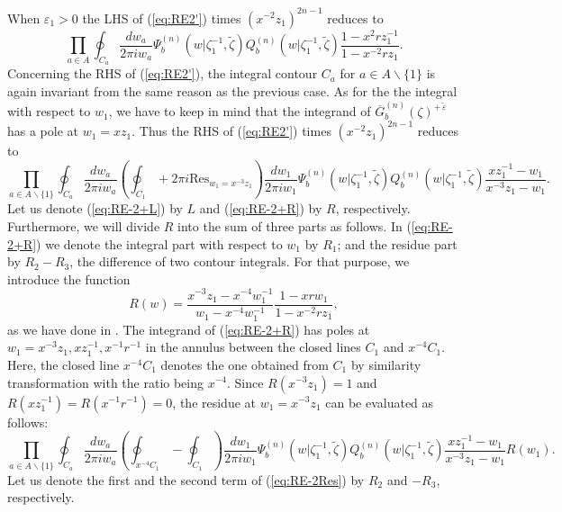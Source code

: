 \documentclass[a4paper,10pt]{article}
\begin{document}
{When $\varepsilon_{1}>0$ the LHS of (\ref{eq:RE2'}) 
times $(x^{-2}z_1)^{2n-1}$ reduces to 
\begin{equation}
\prod_{a\in A}\oint_{C_a} 
\dfrac{dw_a}{2\pi iw_a} 
\Psi_{b}^{(n)} (w|\zeta_1^{-1},\tilde{\zeta})
Q_b^{(n)}(w|\zeta_1^{-1},\tilde{\zeta})
\frac{1-x^2 rz_{1}^{-1}}{1-x^{-2}rz_{1}}. 
\label{eq:RE-2+L}
\end{equation}
Concerning the RHS of (\ref{eq:RE2'}), the integral 
contour $C_a$ for $a\in A\backslash\{ 1\}$ is again 
invariant from the same reason as the previous case. 
As for the the integral with respect to $w_1$, we 
have to keep in mind that the integrand of 
$\overline{G}_{b}^{(n)} (\zeta)^{+\,\tilde{\varepsilon}}$ 
has a pole at $w_1 =xz_1$. Thus the RHS of (\ref{eq:RE2'}) 
times $(x^{-2}z_1)^{2n-1}$ reduces to 
\begin{equation}
\prod_{a\in A\backslash\{ 1\}}\oint_{C_a} 
\dfrac{dw_a}{2\pi iw_a} 
\left( \oint_{C_1} +2\pi i
\mbox{Res}_{w_1 =x^{-3}z_1} \right) 
\dfrac{dw_1}{2\pi iw_1} 
\Psi_{b}^{(n)} (w|\zeta_1^{-1},\tilde{\zeta})
Q_b^{(n)}(w|\zeta_1^{-1},\tilde{\zeta})
\frac{xz_{1}^{-1}-w_1}{x^{-3}z_{1}-w_1}. 
\label{eq:RE-2+R}
\end{equation}
Let us denote (\ref{eq:RE-2+L}) by $L$ and 
(\ref{eq:RE-2+R}) by $R$, respectively. Furthermore, 
we will divide $R$ into the sum of three parts as follows. 
In (\ref{eq:RE-2+R}) we denote the integral part 
with respect to $w_1$ by $R_1$; and the residue part 
by $R_2 -R_3$, the difference of two contour integrals. 
For that purpose, we introduce the function 
$$
R(w)=
\frac{x^{-3}z_1 -x^{-4}w_1^{-1}}{w_1 -x^{-4}w_1^{-1}}
\frac{1-xrw_1}{1-x^{-2}rz_1}, 
$$
as we have done in \cite{JKMQ}. 
The integrand of (\ref{eq:RE-2+R}) has poles at 
$w_1 =x^{-3}z_1, xz_1^{-1}, x^{-1}r^{-1}$ in the 
annulus between the closed lines $C_1$ and $x^{-4}C_1$. 
Here, the closed line $x^{-4}C_1$ denotes the one 
obtained from $C_1$ by similarity transformation with the 
ratio being $x^{-4}$. Since 
$R(x^{-3}z_1 )=1$ and $R(xz_1^{-1})=R(x^{-1}r^{-1})=0$, 
the residue at $w_1 =x^{-3}z_1$ can be evaluated as follows: 
\begin{equation}
\prod_{a\in A\backslash\{ 1\}}\oint_{C_a} 
\dfrac{dw_a}{2\pi iw_a} 
\left( \oint_{x^{-4}C_1} - \oint_{C_1} \right) 
\dfrac{dw_1}{2\pi iw_1} 
\Psi_{b}^{(n)} (w|\zeta_1^{-1},\tilde{\zeta})
Q_b^{(n)}(w|\zeta_1^{-1},\tilde{\zeta})
\frac{xz_{1}^{-1}-w_1}{x^{-3}z_{1}-w_1}R(w_1 ). 
\label{eq:RE-2Res}
\end{equation}
Let us denote the first and the second term of 
(\ref{eq:RE-2Res}) by $R_2$ and $-R_3$, respectively. 
}
\end{document}
